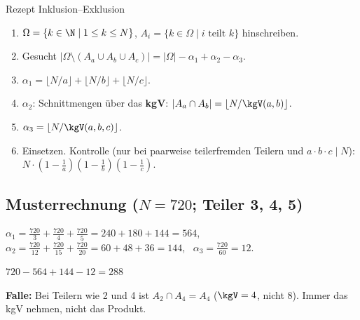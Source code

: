 \begin{rezept}{Rezept Inklusion--Exklusion}
\begin{enumerate}
\item $\Omega = \{k \in \N \mid 1 \le k \le N\}$, $A_i = \{k \in \Omega \mid i \text{ teilt } k\}$ hinschreiben.
\item Gesucht $|\Omega \setminus (A_a \cup A_b \cup A_c)| = |\Omega| - \alpha_1 + \alpha_2 - \alpha_3$.
\item $\alpha_1 = \lfloor N/a \rfloor + \lfloor N/b \rfloor + \lfloor N/c \rfloor$.
\item $\alpha_2$: Schnittmengen über das \textbf{kgV}: $|A_a \cap A_b| = \lfloor N / \kgV(a,b) \rfloor$.
\item $\alpha_3 = \lfloor N / \kgV(a, b, c) \rfloor$.
\item Einsetzen. Kontrolle (nur bei paarweise teilerfremden Teilern und $a \cdot b \cdot c \mid N$): $N \cdot (1 - \frac1a)(1 - \frac1b)(1 - \frac1c)$.
\end{enumerate}
\end{rezept}

\subsection*{Musterrechnung ($N = 720$; Teiler 3, 4, 5)}
$\alpha_1 = \frac{720}{3} + \frac{720}{4} + \frac{720}{5} = 240 + 180 + 144 = 564$, \ $\alpha_2 = \frac{720}{12} + \frac{720}{15} + \frac{720}{20} = 60 + 48 + 36 = 144$, \ $\alpha_3 = \frac{720}{60} = 12$.
\begin{ergebnis} $720 - 564 + 144 - 12 = 288$ \end{ergebnis}
\begin{achtung}
\textbf{Falle:} Bei Teilern wie 2 und 4 ist $A_2 \cap A_4 = A_4$ ($\kgV = 4$, nicht $8$). Immer das kgV nehmen, nicht das Produkt.
\end{achtung}

